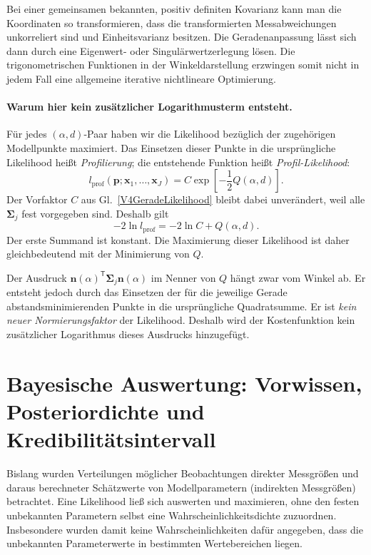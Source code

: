 Bei einer gemeinsamen bekannten, positiv definiten Kovarianz kann
man die Koordinaten so transformieren, dass die transformierten
Messabweichungen unkorreliert sind und Einheitsvarianz besitzen.
Die Geradenanpassung lässt sich dann durch eine Eigenwert- oder
Singulärwertzerlegung lösen. Die trigonometrischen Funktionen in der
Winkeldarstellung erzwingen somit nicht in jedem Fall eine allgemeine
iterative nichtlineare Optimierung.

\paragraph{Warum hier kein zusätzlicher Logarithmusterm entsteht.}
Für jedes $(\alpha,d)$-Paar haben wir die Likelihood bezüglich der
zugehörigen Modellpunkte maximiert. Das Einsetzen dieser Punkte in
die ursprüngliche Likelihood heißt \textsl{Profilierung}; die
entstehende Funktion heißt \textsl{Profil-Likelihood}:
\begin{equation}
l_{\mathrm{prof}}(\mathbf{p};\mathbf{x}_1,\ldots,\mathbf{x}_J)
=C\exp\!\left[-\frac12 Q(\alpha,d)\right].
\label{V4GeradeProfilLikelihood}
\end{equation}
Der Vorfaktor $C$ aus Gl.~\eqref{V4GeradeLikelihood} bleibt dabei
unverändert, weil alle $\boldsymbol{\Sigma}_j$ fest vorgegeben sind.
Deshalb gilt
\[
-2\ln l_{\mathrm{prof}}
=-2\ln C+Q(\alpha,d).
\]
Der erste Summand ist konstant. Die Maximierung dieser Likelihood
ist daher gleichbedeutend mit der Minimierung von $Q$.

Der Ausdruck
$\mathbf{n}(\alpha)^\mathsf{T}\boldsymbol{\Sigma}_j\mathbf{n}(\alpha)$
im Nenner von $Q$ hängt zwar vom Winkel ab. Er entsteht jedoch durch
das Einsetzen der für die jeweilige Gerade abstandsminimierenden
Punkte in die ursprüngliche Quadratsumme. Er ist \emph{kein neuer
Normierungsfaktor} der Likelihood. Deshalb wird der Kostenfunktion
kein zusätzlicher Logarithmus dieses Ausdrucks hinzugefügt.


\section{Bayesische Auswertung: Vorwissen, Posteriordichte und Kredibilitätsintervall}
\label{V4Bayes}

Bislang wurden Verteilungen möglicher Beobachtungen direkter
Messgrößen und daraus berechneter Schätzwerte von Modellparametern (indirekten Messgrößen)
betrachtet. Eine Likelihood ließ sich auswerten und maximieren,
ohne den festen unbekannten Parametern selbst eine
Wahrscheinlichkeitsdichte zuzuordnen. Insbesondere wurden
damit keine Wahrscheinlichkeiten dafür angegeben, dass die
unbekannten Parameterwerte in bestimmten Wertebereichen liegen.

